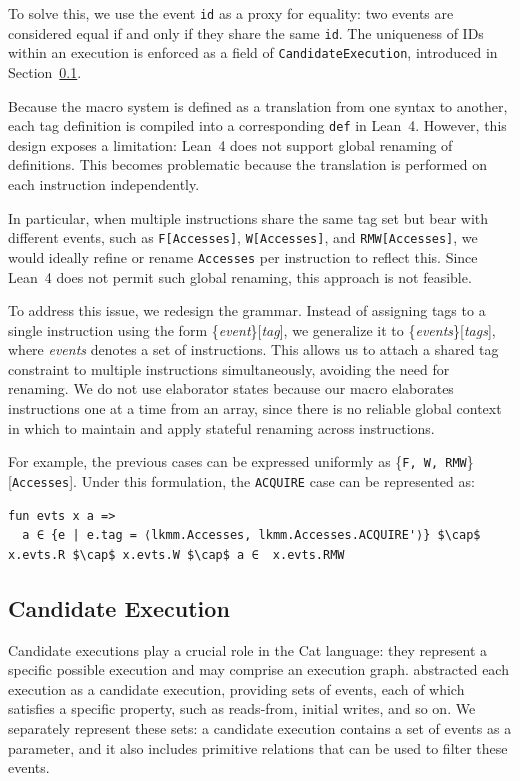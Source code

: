 To solve this, we use the event \texttt{id} as a proxy for equality: two events are considered equal if and only if they share the same \texttt{id}. The uniqueness of IDs within an execution is enforced as a field of \texttt{CandidateExecution}, introduced in Section~\ref{sec:candidate-execution}.

Because the macro system is defined as a translation from one syntax to another, each tag definition is compiled into a corresponding \texttt{def} in Lean~4. However, this design exposes a limitation: Lean~4 does not support global renaming of definitions. This becomes problematic because the translation is performed on each instruction independently.

In particular, when multiple instructions share the same tag set but bear with different events, such as \texttt{F[Accesses]}, \texttt{W[Accesses]}, and \texttt{RMW[Accesses]}, we would ideally refine or rename \texttt{Accesses} per instruction to reflect this. Since Lean~4 does not permit such global renaming, this approach is not feasible.

To address this issue, we redesign the grammar. Instead of assigning tags to a single instruction using the form \{\textit{event}\}[\textit{tag}], we generalize it to \{\textit{events}\}[\textit{tags}], where \textit{events} denotes a set of instructions. This allows us to attach a shared tag constraint to multiple instructions simultaneously, avoiding the need for renaming. We do not use elaborator states because our macro elaborates instructions one at a time from an array, since there is no reliable global context in which to maintain and apply stateful renaming across instructions.

For example, the previous cases can be expressed uniformly as \{\texttt{F, W, RMW}\}[\texttt{Accesses}]. Under this formulation, the \texttt{ACQUIRE} case can be represented as:

\begin{lstlisting}[mathescape=true]
fun evts x a =>
  a ∈ {e | e.tag = ⟨lkmm.Accesses, lkmm.Accesses.ACQUIRE'⟩} $\cap$ x.evts.R $\cap$ x.evts.W $\cap$ a ∈  x.evts.RMW
\end{lstlisting}

\subsection{Candidate Execution}
\label{sec:candidate-execution}
Candidate executions play a crucial role in the Cat language: they represent a specific possible execution and may comprise an execution graph. \citet{catManualSyntax11} abstracted each execution as a candidate execution, providing sets of events, each of which satisfies a specific property, such as reads-from, initial writes, and so on. We separately represent these sets: a candidate execution contains a set of events as a parameter, and it also includes primitive relations that can be used to filter these events.

